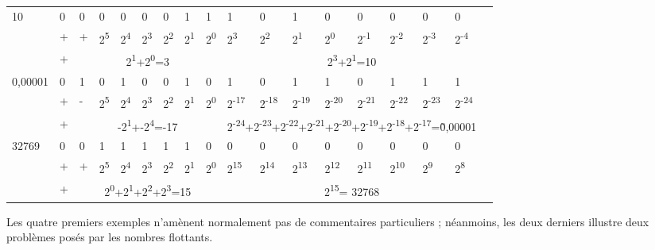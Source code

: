 \begin{table}
\begin{tabular}{p{}|p{}|l|l|l|l|l|l|l|l|l|l|l|l|l|l|l|l|}
  \multirow{3}{2cm}{10} & 0 & 0 & 0 & 0 & 0 & 0 & 1 & 1 & 1 & 0 & 1 & 0 & 0 & 0 & 0 & 0\\ 
  \cline{2-17}
     &+&+&2\textsuperscript{5}&2\textsuperscript{4}&2\textsuperscript{3}&2\textsuperscript{2}&2\textsuperscript{1}&2\textsuperscript{0}&2\textsuperscript{3}&2\textsuperscript{2}&2\textsuperscript{1}&2\textsuperscript{0}&2\textsuperscript{-1}&2\textsuperscript{-2}&2\textsuperscript{-3}&2\textsuperscript{-4}\\ 
  \cline{2-17}
     &+&\multicolumn{7}{c|}{2\textsuperscript{1}+2\textsuperscript{0}=3}&\multicolumn{8}{c|}{2\textsuperscript{3}+2\textsuperscript{1}=10}\\ 
  \hline
  
  \multirow{3}{2cm}{0,00001} & 0 & 1 & 0 & 1 & 0 & 0 & 1 & 0 & 1 & 0 & 1 & 1 & 0 & 1 & 1 & 1\\ 
  \cline{2-17}
    &+&-&2\textsuperscript{5}&2\textsuperscript{4}&2\textsuperscript{3}&2\textsuperscript{2}&2\textsuperscript{1}&2\textsuperscript{0}&2\textsuperscript{-17}&2\textsuperscript{-18}&2\textsuperscript{-19}&2\textsuperscript{-20}&2\textsuperscript{-21}&2\textsuperscript{-22}&2\textsuperscript{-23}&2\textsuperscript{-24}\\ 
  \cline{2-17}
     &+&\multicolumn{7}{c|}{-2\textsuperscript{1}+-2\textsuperscript{4}=-17}&\multicolumn{8}{c|}{2\textsuperscript{-24}+2\textsuperscript{-23}+2\textsuperscript{-22}+2\textsuperscript{-21}+2\textsuperscript{-20}+2\textsuperscript{-19}+2\textsuperscript{-18}+2\textsuperscript{-17}=\~0,00001}\\ 
  \hline
  
  \multirow{3}{2cm}{32769} & 0 & 0 & 1 & 1 & 1 & 1 & 1 & 0 & 0 & 0 & 0 & 0 & 0 & 0 & 0 & 0\\ 
  \cline{2-17}
    &+&+&2\textsuperscript{5}&2\textsuperscript{4}&2\textsuperscript{3}&2\textsuperscript{2}&2\textsuperscript{1}&2\textsuperscript{0}&2\textsuperscript{15}&2\textsuperscript{14}&2\textsuperscript{13}&2\textsuperscript{12}&2\textsuperscript{11}&2\textsuperscript{10}&2\textsuperscript{9}&2\textsuperscript{8}\\ 
  \cline{2-17}
     &+&\multicolumn{7}{c|}{2\textsuperscript{0}+2\textsuperscript{1}+2\textsuperscript{2}+2\textsuperscript{3}=15}&\multicolumn{8}{c|}{2\textsuperscript{15}= 32768}\\ 
  \hline
  \end{tabular}
\end{table}
  
Les quatre premiers exemples n'amènent normalement pas de commentaires
particuliers ; néanmoins, les deux derniers illustre deux problèmes
posés par les nombres flottants.

